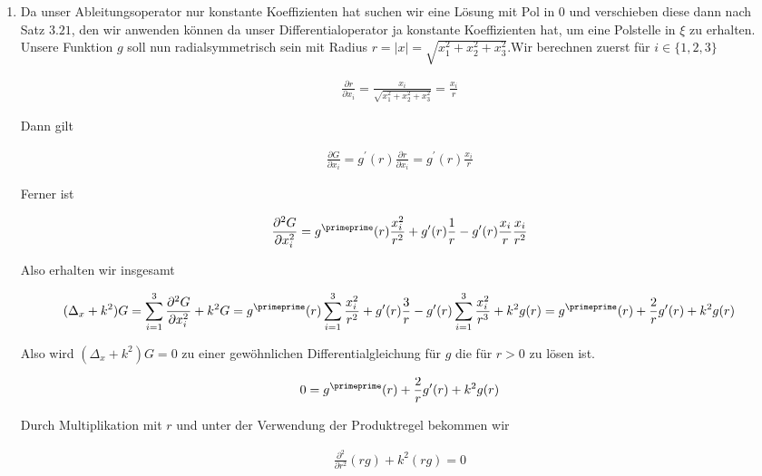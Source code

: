 \begin{solution}
\begin{enumerate}[label = (\roman*)]
\item Da unser Ableitungsoperator nur konstante Koeffizienten hat suchen wir eine Lösung mit Pol in $0$ und verschieben diese dann nach Satz $3.21$, den wir anwenden können da unser Differentialoperator ja konstante Koeffizienten hat, um eine Polstelle in $\xi$ zu erhalten.
Unsere Funktion $g$ soll nun radialsymmetrisch sein mit Radius $r = |x| = \sqrt{x_1^2 + x_2^2 +x_3^2}$.Wir berechnen zuerst für $i \in \{1,2,3\}$

\begin{align*}
  \frac{\partial r}{\partial x_i}
  =
  \frac{x_i}{\sqrt{x_1^2 + x_2^2 + x_3^2}}
  =
  \frac{x_i}{r}
\end{align*}

Dann gilt

\begin{align*}
  \frac{\partial G}{\partial x_i}
  =
  g^\prime (r) \frac{\partial r}{\partial x_i}
  =
  g^\prime (r) \frac{x_i}{r}
\end{align*}

Ferner ist

\begin{align*}
  \frac{\partial^2 G}{\partial x_i^2}
  =
  g^\primeprime(r) \frac{x_i^2}{r^2}
    + g^\prime(r) \frac{1}{r}
    - g^\prime(r) \frac{x_i}{r}\frac{x_i}{r^2}
\end{align*}

Also erhalten wir insgesamt

\begin{align*}
  (\Delta_x +k^2) G
  =
  \sum_{i=1}^3 \frac{\partial^2 G}{\partial x_i^2} + k^2 G
  =
  g^\primeprime(r) \sum_{i=1}^3 \frac{x_i^2}{r^2}
    + g^\prime(r) \frac{3}{r}
    - g^\prime(r) \sum_{i=1}^3 \frac{x_i^2}{r^3}
    + k^2 g(r)
  =
  g^\primeprime(r) + \frac{2}{r} g^\prime(r) + k^2g(r)
\end{align*}

Also wird $(\Delta_x +k^2) G = 0$ zu einer gewöhnlichen Differentialgleichung für $g$ die für $r>0$ zu lösen ist.

\begin{align*}
  0 = g^\primeprime(r) + \frac{2}{r} g^\prime(r) + k^2g(r)
\end{align*}

Durch Multiplikation mit $r$ und unter der Verwendung der Produktregel bekommen wir

\begin{align*}
  \frac{\partial^2}{\partial r^2}(rg) + k^2(rg) = 0
\end{align*}


\end{enumerate}
\end{solution}
